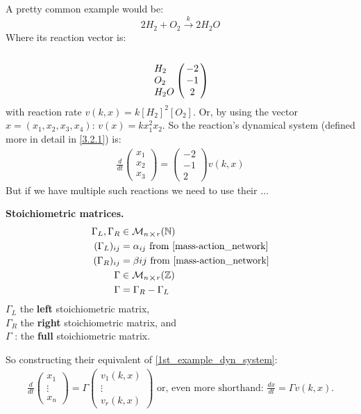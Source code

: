 A pretty common example would be:
\[
	2H_2 + O_2 \xrightarrow{k} 2H_2O
\]
Where its reaction vector is:
\[
	\bordermatrix{\cr \cr
		H_2 & -2 \cr
		O_2 & -1 \cr
		H_2O & 2 \cr
	}
\]
with reaction rate $v(k,x) = k[H_2]^2[O_2]$. Or, by using the vector $x=(x_1, x_2, x_3, x_4)$: $v(x) = k x_1^2 x_2$.
So the reaction's dynamical system (defined more in detail in \ref{3.2.1}) is:
\begin{align}\label{1st_example_dyn_system}
	\frac{d}{dt}
	\begin{pmatrix*}
		x_1 \\
		x_2 \\
		x_3
	\end{pmatrix*} =
	\begin{pmatrix}
		-2 \\
		-1 \\
		2
	\end{pmatrix}
	v(k,x)
\end{align}
But if we have multiple such reactions we need to use their $\ldots$
\begin{definition}
	\textbf{Stoichiometric matrices.}
	\begin{align*}
		\Gamma_L, \Gamma_R &\in \mathcal{M}_{n \bigtimes r}(\mathbb{N}) \\
		(\Gamma_L)_{ij} &= \alpha_{ij} \text{ from \ref{mass-action_network}} \\
		(\Gamma_R)_{ij} &= \beta{ij} \text{ from \ref{mass-action_network}} \\
		\Gamma &\in \mathcal{M}_{n \bigtimes r}(\mathbb{Z}) \\
		\Gamma &= \Gamma_R - \Gamma_L
	\end{align*}
	$\Gamma_L$ the \textbf{left} stoichiometric matrix, \\
	$\Gamma_R$ the \textbf{right} stoichiometric matrix, and \\
	$\Gamma$ : the \textbf{full} stoichiometric matrix.
\end{definition}
So constructing their equivalent of \ref{1st_example_dyn_system}:
\begin{align}\label{crn_system_matrix_form}
	\frac{d}{dt}
	\begin{pmatrix*}
		x_1 \\
		\vdots \\
		x_n
	\end{pmatrix*} = \Gamma
	\begin{pmatrix*}
		v_1(k,x)	 \\
		\vdots \\
		v_r(k,x)
	\end{pmatrix*}
	\text{ or, even more shorthand:  }
	\frac{dx}{dt} = \Gamma v(k,x).
\end{align}
